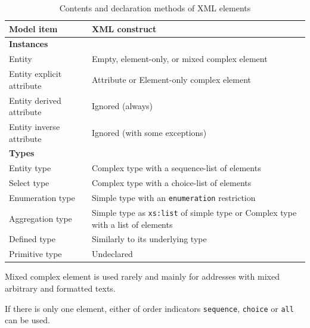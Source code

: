 \begin{table}[h]\footnotesize
    \centering
    \caption{Contents and declaration methods of XML elements}
    \label{tab:data-model-to-xml}
    
    \begin{threeparttable}
        \begin{tabu} to \columnwidth { l X[l] }
            \hline
                \textbf{Model item}  &   \textbf{XML construct}         \\
            \hline
                \textbf{Instances}  &                      \\
                Entity              &   Empty, element-only, or mixed complex element                      \\
                Entity explicit attribute    &   Attribute or Element-only complex element                      \\
                Entity derived attribute    &   Ignored (always)                      \\
                Entity inverse attribute    &   Ignored (with some exceptions)                     \\
            \hline
                \textbf{Types}      &                      \\
                Entity type         &   Complex type \newline with a sequence-list of elements   \\
                Select type         &   Complex type \newline with a choice-list of elements \\
                Enumeration type    &   Simple type with an \texttt{enumeration} restriction \\
                Aggregation type    &   Simple type as \texttt{xs:list} of simple type or Complex type with a list of elements \\
                Defined type        &   Similarly to its underlying type     \\
                Primitive type      &   Undeclared \\
            \hline
        \end{tabu}
        \begin{tablenotes}
          \item \label{tn:mixed-element} Mixed complex element is used rarely and mainly for addresses with mixed arbitrary and formatted texts.
          \item \label{tn:choice-instead-sequence} If there is only one element, either of order indicators \texttt{sequence}, \texttt{choice} or \texttt{all} can be used.          
        \end{tablenotes}
    \end{threeparttable}
\end{table}



